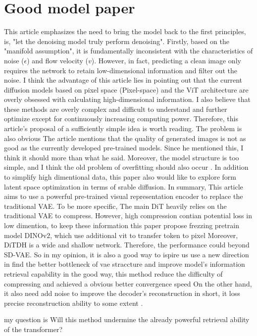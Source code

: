 \documentclass[sigconf, screen]{acmart}
\begin{document}
\section{Good model paper}
This article \cite{li2026back} emphasizes the need to bring the model back to the first principles, 
is, "let the denoising model truly perform denoising". Firstly, based on the 
"manifold assumption", it is fundamentally inconsistent with the characteristics 
of noise ($\epsilon$) and flow velocity ($v$). However, in fact, predicting a clean 
image only requires the network to retain low-dimensional information and filter out 
the noise. I think the advantage of this article lies in pointing out that the current
diffusion models based on pixel space (Pixel-space) and the ViT architecture are 
overly obsessed with calculating high-dimensional information. I also believe that 
these methods are overly complex and difficult to understand and further optimize 
except for continuously increasing computing power. Therefore, this article's 
proposal of a sufficiently simple idea is worth reading. The problem is also obvious
The article mentions that the quality of generated images is not as good as the 
currently developed pre-trained models. Since he mentioned this, I think it should 
more than what he said. Moreover, the model structure is too simple, and I think
the old problem of overfitting should also occur \cite{li2026back}.
In addition to simplify high dimentional data, this paper also would like to explore
form latent space optimization in terms of srable diffusion.
In summary, This article aims to use a powerful pre-trained visual representation encoder to replace the traditional VAE.
To be more specific, The main DiT heavily relies on the traditional VAE to compress.
However, high compression contian potential loss in low dimention, to keep these information
this paper propose frezzing pretrain model DINOv2, which use additional vit to transfer token to pixel
Moreover, DiTDH is a wide and  shallow network. Therefore, the performance could beyond SD-VAE. So in my opinion, it is also a 
good way to ispire us use a new direction in find the better bottleneck of vae straccture and improve model's information retrieval capability
in the good way, this method reduce the difficulty of compressing and achieved a obvious better convergence speed
On the other hand, it also need add  noise to improve the decoder's reconstruction
in short, it loss precise reconstruction ability to some extent \cite{zheng2025diffusion}.

my question is Will this method undermine the already powerful retrieval ability of the transformer?
\end{document}
